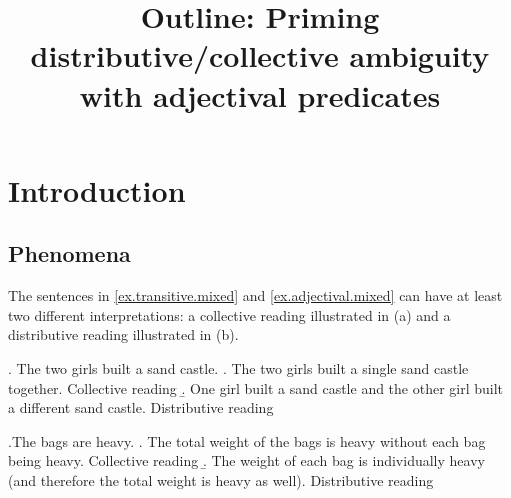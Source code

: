 \documentclass[a4paper]{article}
\title{Outline: Priming distributive/collective ambiguity with adjectival predicates}
\author{}
\begin{document}
\maketitle

\section{Introduction}
\subsection{Phenomena}
The sentences in \ref{ex.transitive.mixed} and \ref{ex.adjectival.mixed} can have at least two different interpretations: a collective reading illustrated in (a) and a distributive reading illustrated in (b). 

\ex. The two girls built a sand castle. \label{ex.transitive.mixed}
\a. The two girls built a single sand castle together. \hfill{Collective reading}
\b. One girl built a sand castle and the other girl built a different sand castle.  \hfill{Distributive reading}

\ex.The bags are heavy. \label{ex.adjectival.mixed}
\a. The total weight of the bags is heavy without each bag being heavy. \hfill{Collective reading} 
\b. The weight of each bag is individually heavy (and therefore the total weight is heavy as well).  \hfill{Distributive reading}
\end{document}
